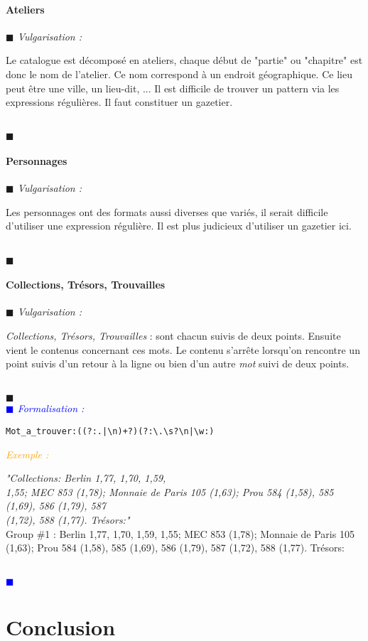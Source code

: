 \documentclass[a4paper, 11pt]{book}
\newenvironment{vulgarisation}
    {
    \textit{\textcolor{dark-blue}{$\blacksquare$  Vulgarisation : \\}}

    }
    {
    ~\\\textcolor{dark-blue}{$\blacksquare$}\\
    }
\newenvironment{formalisation}
    {
    \textit{\textcolor{blue}{$\blacksquare$  Formalisation : \\}}
    }
    {
    ~\\\textcolor{blue}{$\blacksquare$}\\
    }
\newenvironment{exemple}
    {
    \textit{\textcolor{orange}{
    Exemple : \\}}
    }
    {\\
    }
\begin{document}
\subsubsection{Ateliers}
\begin{vulgarisation}
	Le catalogue est décomposé en ateliers, chaque début de "partie" ou "chapitre" est donc le nom de l'atelier. Ce nom correspond à un endroit géographique. Ce lieu peut être une ville, un lieu-dit, ... Il est difficile de trouver un pattern via les expressions régulières. Il faut constituer un gazetier.
\end{vulgarisation}

\subsubsection{Personnages}
\begin{vulgarisation}
	Les personnages ont des formats aussi diverses que variés, il serait difficile d'utiliser une expression régulière. Il est plus judicieux d'utiliser un gazetier ici. 
\end{vulgarisation}

\subsubsection{Collections, Trésors, Trouvailles}
\begin{vulgarisation}
	\textit{Collections, Trésors, Trouvailles} : sont chacun suivis de deux points. Ensuite vient le contenus concernant ces mots. Le contenu s'arrête lorsqu'on rencontre un point suivis d'un retour à la ligne ou bien d'un autre \textit{mot} suivi de deux points.
\end{vulgarisation}
\begin{formalisation}
	\begin{verbatim}
Mot_a_trouver:((?:.|\n)+?)(?:\.\s?\n|\w:)
	\end{verbatim}
	\begin{exemple}
		\emph{"Collections: Berlin 1,77, 1,70, 1,59, \\
			1,55; MEC 853 (1,78); Monnaie de Paris 105 (1,63); Prou 584 (1,58), 585 (1,69), 586 (1,79), 587 \\
			(1,72), 588 (1,77). Trésors:"}\\
		Group \#1 :  Berlin 1,77, 1,70, 1,59,
		1,55; MEC 853 (1,78); Monnaie de Paris 105 (1,63); Prou 584 (1,58), 585 (1,69), 586 (1,79), 587 (1,72), 588 (1,77). Trésors:
	\end{exemple}
\end{formalisation}




\chapter{Conclusion}
\end{document}
